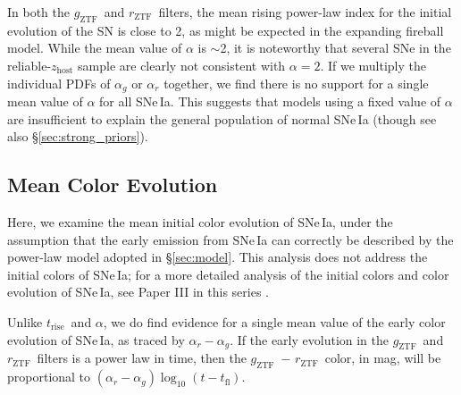 \documentclass[twocolumn]{./aastex63}
\newcommand{\rztf}{$r_\mathrm{ZTF}$}
\newcommand{\gztf}{$g_\mathrm{ZTF}$}
\newcommand{\trise}{$t_\mathrm{rise}$}
\begin{document}
In both the \gztf\ and \rztf\ filters, the mean rising power-law index for the
initial evolution of the SN is close to 2, as might be expected in the
expanding fireball model. While the mean value of $\alpha$ is $\sim$2, it is
noteworthy that several SNe in the reliable-$z_\mathrm{host}$ sample are
clearly not consistent with $\alpha = 2$. If we multiply the individual PDFs
of $\alpha_g$ or $\alpha_r$ together, we find there is no support for a single
mean value of $\alpha$ for all SNe\,Ia. This suggests that models using a
fixed value of $\alpha$ are insufficient to explain the general population of
normal SNe\,Ia (though see also \S\ref{sec:strong_priors}).



\subsection{Mean Color Evolution}\label{sec:colors}

Here, we examine the mean initial color evolution of SNe\,Ia, under the
assumption that the early emission from SNe\,Ia can correctly be described by
the power-law model adopted in \S\ref{sec:model}. This analysis does not
address the initial colors of SNe\,Ia; for a more detailed analysis of the
initial colors and color evolution of SNe\,Ia, see Paper III in this series
\citep{Bulla20}.

Unlike \trise\ and $\alpha$, we do find evidence for a single mean value of
the early color evolution of SNe\,Ia, as traced by $\alpha_r - \alpha_g$. If
the early evolution in the \gztf\ and \rztf\ filters is a power law in time,
then the \gztf\ $-$ \rztf\ color, in mag, will be proportional to $(\alpha_r -
\alpha_g) \log_{10} (t - t_\mathrm{fl})$.
\end{document}
